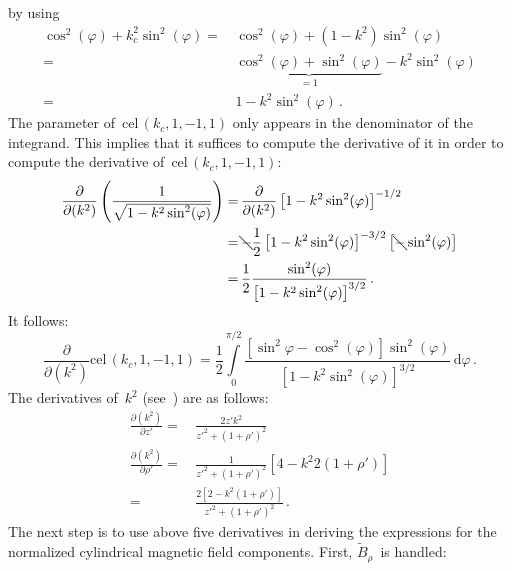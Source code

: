 by using
\begin{align}
      \cos^2(\varphi) + k_c^2 \sin^2(\varphi)
 =&\, \cos^2(\varphi) + (1 - k^2) \sin^2(\varphi) \nonumber \\
 =&\, \underbrace{\cos^2(\varphi) + \sin^2(\varphi)}_{=1} - k^2 \sin^2(\varphi) \nonumber \\
 =&\, 1 - k^2 \sin^2(\varphi) \, .
\end{align}
The parameter of~$\textrm{cel}\,(k_c, 1, -1, 1)$ only appears in the denominator of the integrand.
This implies that it suffices to compute the derivative of it
in order to compute the derivative of~$\textrm{cel}\,(k_c, 1, -1, 1)$:
\begin{align}
      \frac{\partial}{\partial(k^2)} \left( \frac{1}{\sqrt{1 - k^2 \sin^2(\varphi)}} \right)
 =&\, \frac{\partial}{\partial(k^2)} \left[1 - k^2 \sin^2(\varphi)\right]^{-1/2} \nonumber \\
 =&\, \bcancel{-} \frac{1}{2} \left[1 - k^2 \sin^2(\varphi)\right]^{-3/2} \left[ \bcancel{-} \sin^2(\varphi) \right] \nonumber \\
 =&\, \frac{1}{2} \frac{\sin^2(\varphi)}{\left[1 - k^2 \sin^2(\varphi)\right]^{3/2}} \, .
\end{align}
It follows:
\begin{equation}
  \frac{\partial}{\partial(k^2)} \textrm{cel}\,(k_c, 1, -1, 1)
 = \frac{1}{2} \int\limits_0^{\pi/2} \frac{\left[\sin^2{\varphi} - \cos^2(\varphi)\right]\sin^2(\varphi)}{\left[1 - k^2 \sin^2(\varphi)\right]^{3/2}} \,\mathrm{d}\varphi \, .
\end{equation}
The derivatives of~$k^2$ (see~) are as follows:
\begin{align}
      \frac{\partial (k^2)}{\partial z'}
 =&\, \frac{2 z' k^2}{z'^2 + (1 + \rho')^2} \\
      \frac{\partial (k^2)}{\partial \rho'}
 =&\, \frac{1}{z'^2 + (1 + \rho')^2} \left[ 4 - k^2 2 (1 + \rho') \right] \\
 =&\, \frac{2 \left[ 2 - k^2 (1 + \rho') \right]}{z'^2 + (1 + \rho')^2} \, .
\end{align}
The next step is to use above five derivatives in deriving the expressions
for the normalized cylindrical magnetic field components.
First, $\tilde{B}_\rho$~is handled:
